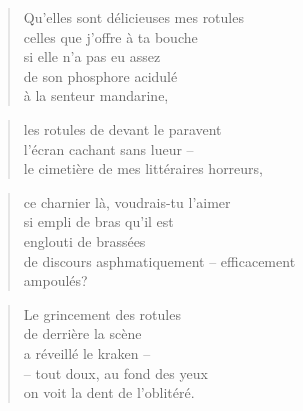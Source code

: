   \begin{verse}
    Qu’elles sont délicieuses mes rotules\\
    celles que j’offre à ta bouche\\
    si elle n’a pas eu assez\\
    de son phosphore acidulé\\
    à la senteur mandarine,
  \end{verse}
  \begin{verse}
    les rotules de devant le paravent\\
    l’écran cachant sans lueur --\\
    le cimetière de mes littéraires horreurs,
  \end{verse}
  \begin{verse}
    ce charnier là, voudrais-tu l’aimer\\
    si empli de bras qu’il est\\
    englouti de brassées\\
    de discours asphmatiquement -- efficacement\\
    ampoulés?
  \end{verse}
  \begin{verse}
    Le grincement des rotules\\
    de derrière la scène\\
    a réveillé le kraken -- \\
    -- tout doux, au fond des yeux\\
    on voit la dent de l’oblitéré.
  \end{verse}


